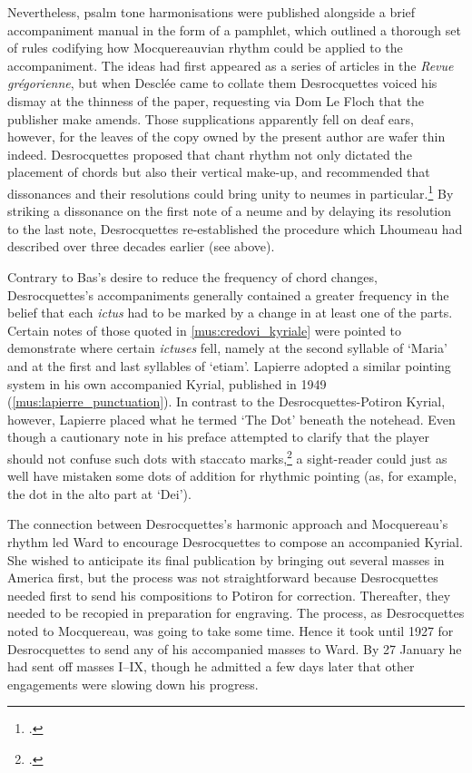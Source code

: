 Nevertheless, psalm tone harmonisations were published alongside a brief accompaniment manual in the form of a pamphlet, which outlined a thorough set of rules codifying how Mocquereauvian rhythm could be applied to the accompaniment.
The ideas had first appeared as a series of articles in the \emph{Revue grégorienne}, but when Desclée came to collate them Desrocquettes voiced his dismay at the thinness of the paper, requesting via Dom Le Floch that the publisher make amends.
Those supplications apparently fell on deaf ears, however, for the leaves of the copy owned by the present author are wafer thin indeed.
Desrocquettes proposed that chant rhythm not only dictated the placement of chords but also their vertical make-up, and recommended that dissonances and their resolutions could bring unity to neumes in particular.\footcite[5, 30--32]{Desrocquettesaccompagnementrythmiqueapres1928}
By striking a dissonance on the first note of a neume and by delaying its resolution to the last note, Desrocquettes re-established the procedure which Lhoumeau had described over three decades earlier (see  above).

Contrary to Bas's desire to reduce the frequency of chord changes, Desrocquettes's accompaniments generally contained a greater frequency in the belief that each \emph{ictus} had to be marked by a change in at least one of the parts.
Certain notes of those quoted in \cref{mus:credovi_kyriale} were pointed to demonstrate where certain \emph{ictuses} fell, namely at the second syllable of `Maria' and at the first and last syllables of `etiam'.
Lapierre adopted a similar pointing system in his own accompanied Kyrial, published in 1949 (\cref{mus:lapierre_punctuation}).
In contrast to the Desrocquettes-Potiron Kyrial, however, Lapierre placed what he termed `The Dot' beneath the notehead.
Even though a cautionary note in his preface attempted to clarify that the player should not confuse such dots with staccato marks,\footcite[unpaginated preface and p.~8]{LapierreSimplifiedModalAccompaniment1946} a sight-reader could just as well have mistaken some dots of addition for rhythmic pointing (as, for example, the dot in the alto part at `Dei').

The connection between Desrocquettes's harmonic approach and Mocquereau's rhythm led Ward to encourage Desrocquettes to compose an accompanied Kyrial.
She wished to anticipate its final publication by bringing out several masses in America first, but the process was not straightforward because Desrocquettes needed first to send his compositions to Potiron for correction.
Thereafter, they needed to be recopied in preparation for engraving.
The process, as Desrocquettes noted to Mocquereau, was going to take some time.
Hence it took until 1927 for Desrocquettes to send any of his accompanied masses to Ward.
By 27 January he had sent off masses I--IX, though he admitted a few days later that other engagements were slowing down his progress.

